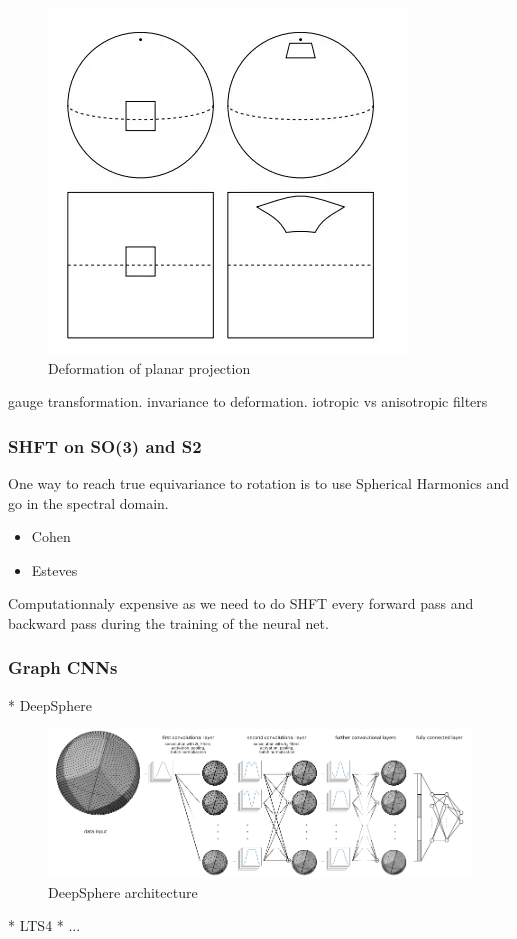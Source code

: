 \documentclass[11pt]{report}
\begin{document}
\begin{figure}[h!]
    \centering
    \includegraphics[width=0.5\linewidth]{v2-9d6a9d92bb02bc9e198c4c16397ce2fd_b.jpg}
    \caption{Deformation of planar projection \cite{cohen_spherical_2018}}
    \label{fig:planar_projection}
\end{figure}

gauge transformation. invariance to deformation. iotropic vs anisotropic filters
\subsubsection{SHFT on SO(3) and S2}
One way to reach true equivariance to rotation is to use Spherical Harmonics and go in the spectral domain.
\begin{itemize}
    \item Cohen \cite{cohen_spherical_2018}
    \item Esteves \cite{esteves_learning_2017}
\end{itemize}
Computationnaly expensive as we need to do SHFT every forward pass and backward pass during the training of the neural net.
\subsubsection{Graph CNNs}
* DeepSphere \cite{perraudin_deepsphere:_2018}
\begin{figure}[h!]
    \centering
    \includegraphics[width=0.8\linewidth]{figure2-Blogpost-SCNN.png}
    \caption{DeepSphere architecture}
    \label{fig:deepsphere}
\end{figure}
* LTS4 \cite{frossard_graph-based_2017}
* ...
\end{document}
